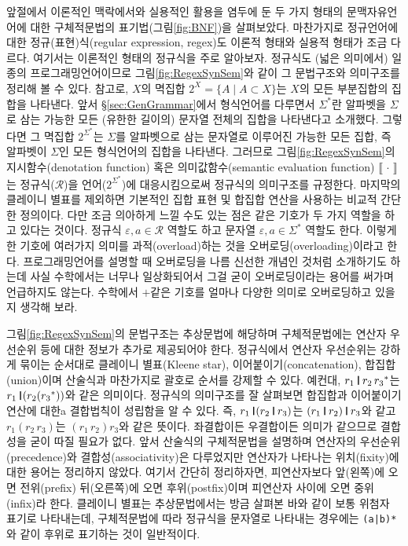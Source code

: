 \documentclass[b5paper,chapter,figtabcapt]{oblivoir}
\newcommand{\VERT}{\ensuremath{\mathop{\!\resizebox{1.65ex}{.7em}{\texttt{|}}\!}}}
\begin{document}
앞절에서 이론적인 맥락에서와 실용적인 활용을 염두에 둔 두 가지 형태의
문맥자유언어에 대한 구체적문법의 표기법(그림\;\ref{fig:BNF})을 살펴보았다.
마찬가지로 정규언어에 대한 정규(표현)식(regular expression, regex)도
이론적 형태와 실용적 형태가 조금 다르다. 여기서는 이론적인 형태의
정규식을 주로 알아보자. 정규식도 (넓은 의미에서) 일종의 프로그래밍언어이므로
그림\;\ref{fig:RegexSynSem}와 같이 그 문법구조와 의미구조를 정리해 볼 수 있다.
참고로, $X$의 멱집합 $2^X = \{A\mid A\subset X\}$는 $X$의 모든 부분집합의
집합을 나타낸다. 앞서 \S\ref{sec:GenGrammar}에서 형식언어를 다루면서
$\Sigma^{*}$란 알파벳을 $\Sigma$로 삼는 가능한 모든 (유한한 길이의)
문자열 전체의 집합을 나타낸다고 소개했다. 그렇다면 그 멱집합
$2^{\Sigma^{*}}$는 $\Sigma$를 알파벳으로 삼는 문자열로 이루어진
가능한 모든 집합, 즉 알파벳이 $\Sigma$인 모든 형식언어의 집합을 나타낸다.
그러므로 그림\;\ref{fig:RegexSynSem}의 지시함수(denotation function) 혹은
의미값함수(semantic evaluation function) $\llbracket\,\cdot\,\rrbracket$는
정규식($\mathcal{R}$)을 언어($2^{\Sigma^{*}}$)에 대응시킴으로써 정규식의
의미구조를 규정한다. 마지막의 클레이니 별표를 제외하면 기본적인 집합 표현
및 합집합 연산을 사용하는 비교적 간단한 정의이다. 다만 조금 의아하게 느낄
수도 있는 점은 같은 기호가 두 가지 역할을 하고 있다는 것이다.
정규식 $\varepsilon,a\in\mathcal{R}$ 역할도 하고
문자열 $\varepsilon,a\in\Sigma^{*}$ 역할도 한다.
이렇게 한 기호에 여러가지 의미를 과적(overload)하는 것을
오버로딩(overloading)이라고 한다. 프로그래밍언어를 설명할
때 오버로딩을 나름 신선한 개념인 것처럼 소개하기도 하는데
사실 수학에서는 너무나 일상화되어서 그걸 굳이 오버로딩이라는
용어를 써가며 언급하지도 않는다. 수학에서 $+$같은 기호를 얼마나
다양한 의미로 오버로딩하고 있을지 생각해 보라.

그림\;\ref{fig:RegexSynSem}의 문법구조는 추상문법에 해당하며
구체적문법에는 연산자 우선순위 등에 대한 정보가 추가로 제공되어야 한다.
정규식에서 연산자 우선순위는 강하게 묶이는 순서대로
클레이니 별표(Kleene star), 이어붙이기(concatenation), 합집합(union)이며
산술식과 마찬가지로 괄호로 순서를 강제할 수 있다. 예컨대,
$r_1\VERT r_2\,{r_3}^{*}$는 $r_1\VERT(r_2({r_3}^{*}))$와 같은 의미이다.
정규식의 의미구조를 잘 살펴보면 합집합과 이어붙이기 연산에 대한a
결합법칙이 성립함을 알 수 있다.
즉, $r_1\VERT(r_2\VERT r_3)$는 $(r_1\VERT r_2)\VERT r_3$와
같고 $r_1(r_2\,r_3)$는 $(r_1\,r_2)r_3$와 같은 뜻이다.
좌결합이든 우결합이든 의미가 같으므로 결합성을 굳이 따질 필요가 없다.
앞서 산술식의 구체적문법을 설명하며 연산자의 우선순위(precedence)와
결합성(associativity)은 다루었지만 연산자가 나타나는 위치(fixity)에
대한 용어는 정리하지 않았다. 여기서 간단히 정리하자면, 피연산자보다
앞(왼쪽)에 오면 전위(prefix) 뒤(오른쪽)에 오면 후위(postfix)이며
피연산자 사이에 오면 중위(infix)라 한다. 클레이니 별표는 추상문법에서는
방금 살펴본 바와 같이 보통 위첨자 표기로 나타내는데, 구체적문법에 따라
정규식을 문자열로 나타내는 경우에는 \verb/(a|b)*/와 같이 후위로
표기하는 것이 일반적이다.
\end{document}
